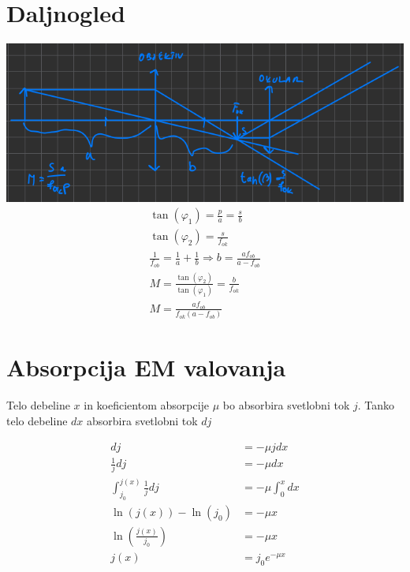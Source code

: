 \documentclass[a4paper,12pt]{article}
\begin{document}
\section{Daljnogled}\label{sec:daljnogled}
\includegraphics[width=\textwidth]{daljnogled.png}
\begin{align}
    \tan(\varphi_1) = \frac{p}{a} = \frac{s}{b}                                              \\
    \tan(\varphi_2) = \frac{s}{f_{ok}}                                                       \\
    \frac{1}{f_{ob}} = \frac{1}{a} + \frac{1}{b} \Rightarrow b = \frac{a f_{ob}}{a - f_{ob}} \\
    M = \frac{\tan(\varphi_2)}{\tan(\varphi_1)} = \frac{b}{f_{ok}}                           \\
    M = \frac{a f_{ob}}{f_{ok} (a - f_{ob})}
\end{align}

\newpage
\section{Absorpcija EM valovanja}
Telo debeline $x$ in koeficientom absorpcije $\mu$ bo absorbira svetlobni tok $j$.
Tanko telo debeline $dx$ absorbira svetlobni tok $dj$

\begin{align}
    dj                               & = -\mu j dx            \\
    \frac{1}{j} dj                   & = -\mu dx              \\
    \int_{j_0}^{j(x)} \frac{1}{j} dj & = -\mu \int_{0}^{x} dx \\
    \ln(j(x)) - \ln(j_0)             & = -\mu x               \\
    \ln\left(\frac{j(x)}{j_0}\right) & = -\mu x               \\
    j(x)                             & = j_0 e^{-\mu x}
\end{align}
\end{document}
